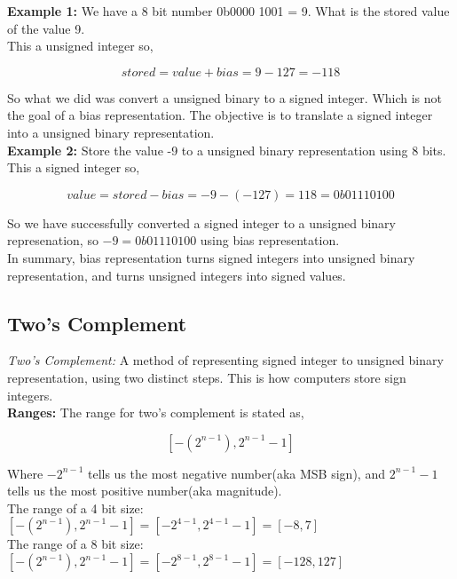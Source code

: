 \documentclass{article}
\begin{document}
\textbf{Example 1:} We have a 8 bit number 0b0000 1001 = 9. What is the stored value of the value 9. \\

This a unsigned integer so, 

\[
stored = value + bias = 9 - 127 = -118
\]

So what we did was convert a unsigned binary to a signed integer. Which is not the goal of a bias representation. The 
objective is to translate a signed integer into a unsigned binary representation. \\

\noindent \textbf{Example 2:} Store the value -9 to a unsigned binary representation using 8 bits. \\ 

This a signed integer so, 

\[
value = stored - bias = -9 -(-127) = 118 = 0b0111 0100
\]

So we have successfully converted a signed integer to a unsigned binary represenation, so $-9 = 0b0111 0100$ using bias 
representation. \\

\noindent In summary, bias representation turns signed integers into unsigned binary representation, and turns unsigned 
integers into signed values.

\subsection*{Two's Complement} 
\textit{Two's Complement:} A method of representing signed integer to unsigned binary representation, using two
distinct steps. This is how computers store sign integers. \\

\noindent \textbf{Ranges:} The range for two's complement is stated as,

\[
[-(2^{n-1}), 2^{n-1} - 1]
\]

\noindent Where $-2^{n-1}$ tells us the most negative number(aka MSB sign), and $2^{n-1} - 1$ tells us the most
positive number(aka magnitude). \\

\noindent The range of a 4 bit size: $[-(2^{n-1}), 2^{n-1} - 1] = [-2^{4-1}, 2^{4-1} - 1] = [-8, 7]$ \\

\noindent The range of a 8 bit size: $[-(2^{n-1}), 2^{n-1} - 1] = [-2^{8-1}, 2^{8-1} - 1] = [-128, 127]$ \\
\end{document}
